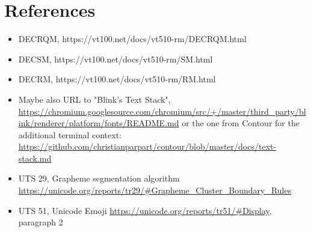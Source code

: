 \documentclass{article}
\begin{document}
\section{References}

\begin{itemize}
	\item \label{ref:DECRQM}DECRQM, https://vt100.net/docs/vt510-rm/DECRQM.html
	\item \label{ref:DECSM}DECSM, https://vt100.net/docs/vt510-rm/SM.html
	\item \label{ref:DECRM}DECRM, https://vt100.net/docs/vt510-rm/RM.html
    \item Maybe also URL to "Blink's Text Stack",
		\url{https://chromium.googlesource.com/chromium/src/+/master/third\_party/blink/renderer/platform/fonts/README.md}
        or the one from Contour for the additional terminal context:
		\url{https://github.com/christianparpart/contour/blob/master/docs/text-stack.md}
    \item \label{ref:UTS-29}UTS 29, Grapheme segmentation algorithm
		\url{https://unicode.org/reports/tr29/\#Grapheme\_Cluster\_Boundary\_Rules}
    \item \label{ref:UTS-51}UTS 51, Unicode Emoji
		\url{https://unicode.org/reports/tr51/\#Display}, paragraph 2
\end{itemize}
\end{document}
